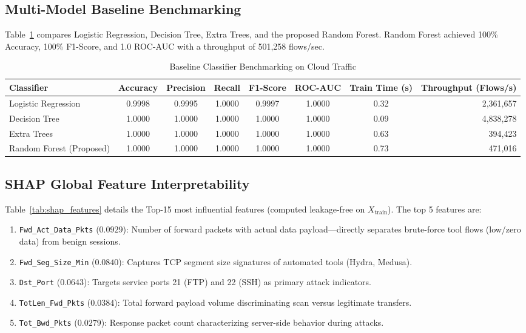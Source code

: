 \documentclass[conference]{IEEEtran}
\begin{document}
\subsection{Multi-Model Baseline Benchmarking}
Table~\ref{tab:baseline_results} compares Logistic Regression, Decision Tree, Extra Trees, and the proposed Random Forest. Random Forest achieved 100\% Accuracy, 100\% F1-Score, and 1.0 ROC-AUC with a throughput of 501,258 flows/sec.

\begin{table}[t]
\caption{Baseline Classifier Benchmarking on Cloud Traffic}
\label{tab:baseline_results}
\centering
\begin{tabular}{lccccccr}
\toprule
\textbf{Classifier} & \textbf{Accuracy} & \textbf{Precision} & \textbf{Recall} & \textbf{F1-Score} & \textbf{ROC-AUC} & \textbf{Train Time (s)} & \textbf{Throughput (Flows/s)} \\
\midrule
Logistic Regression & 0.9998 & 0.9995 & 1.0000 & 0.9997 & 1.0000 & 0.32 & 2,361,657 \\
Decision Tree & 1.0000 & 1.0000 & 1.0000 & 1.0000 & 1.0000 & 0.09 & 4,838,278 \\
Extra Trees & 1.0000 & 1.0000 & 1.0000 & 1.0000 & 1.0000 & 0.63 & 394,423 \\
Random Forest (Proposed) & 1.0000 & 1.0000 & 1.0000 & 1.0000 & 1.0000 & 0.73 & 471,016 \\
\bottomrule
\end{tabular}
\end{table}

\subsection{SHAP Global Feature Interpretability}
Table~\ref{tab:shap_features} details the Top-15 most influential features (computed leakage-free on $X_{\text{train}}$). The top 5 features are:
\begin{enumerate}
    \item \texttt{Fwd\_Act\_Data\_Pkts} ($0.0929$): Number of forward packets with actual data payload---directly separates brute-force tool flows (low/zero data) from benign sessions.
    \item \texttt{Fwd\_Seg\_Size\_Min} ($0.0840$): Captures TCP segment size signatures of automated tools (Hydra, Medusa).
    \item \texttt{Dst\_Port} ($0.0643$): Targets service ports 21 (FTP) and 22 (SSH) as primary attack indicators.
    \item \texttt{TotLen\_Fwd\_Pkts} ($0.0384$): Total forward payload volume discriminating scan versus legitimate transfers.
    \item \texttt{Tot\_Bwd\_Pkts} ($0.0279$): Response packet count characterizing server-side behavior during attacks.
\end{enumerate}
\end{document}
